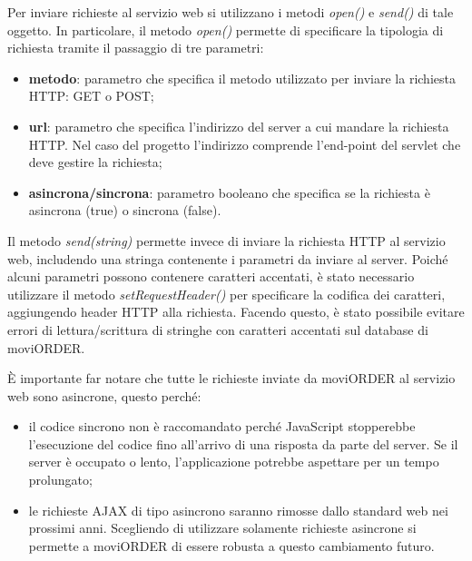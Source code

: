 Per inviare richieste al servizio web si utilizzano i metodi \textit{open()} e \textit{send()} di tale oggetto. In particolare, il metodo \textit{open()} permette di specificare la tipologia di richiesta tramite il passaggio di tre parametri:
	\begin{itemize}
		\item \textbf{metodo}: parametro che specifica il metodo utilizzato per inviare la richiesta HTTP: GET o POST;
		\item \textbf{url}: parametro che specifica l'indirizzo del server a cui mandare la richiesta HTTP. Nel caso del progetto l'indirizzo comprende l'end-point del servlet che deve gestire la richiesta;
		\item \textbf{asincrona/sincrona}: parametro booleano che specifica se la richiesta è asincrona (true) o sincrona (false).
	\end{itemize}
Il metodo \textit{send(string)} permette invece di inviare la richiesta HTTP al servizio web, includendo una stringa contenente i parametri da inviare al server. Poiché alcuni parametri possono contenere caratteri accentati, è stato necessario utilizzare il metodo \textit{setRequestHeader()} per specificare la codifica dei caratteri, aggiungendo header HTTP alla richiesta. Facendo questo, è stato possibile evitare errori di lettura/scrittura di stringhe con caratteri accentati sul database di moviORDER. 

È importante far notare che tutte le richieste inviate da moviORDER al servizio web sono asincrone, questo perché:
\begin{itemize}
	\item il codice sincrono non è raccomandato perché JavaScript stopperebbe l'esecuzione del codice fino all'arrivo di una risposta da parte del server. Se il server è occupato o lento, l'applicazione potrebbe aspettare per un tempo prolungato;
	\item le richieste AJAX di tipo asincrono saranno rimosse dallo standard web nei prossimi anni. Scegliendo di utilizzare solamente richieste asincrone si permette a moviORDER di essere robusta a questo cambiamento futuro.
\end{itemize} 

